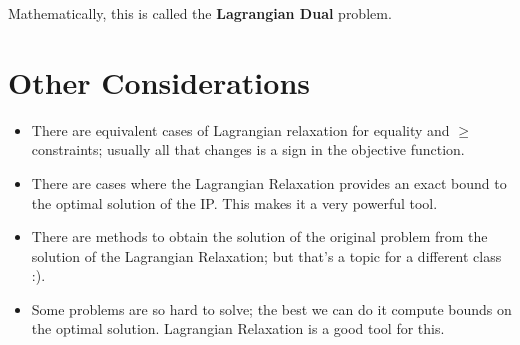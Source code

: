 \documentclass[11pt]{article}
\theoremstyle{definition}
\begin{document}
\vspace{2cm}

Mathematically, this is called the \textbf{Lagrangian Dual} problem.

\vfill

\section{Other Considerations}

\begin{itemize}
\item There are equivalent cases of Lagrangian relaxation for equality and $\geq$ constraints; usually all that changes is a sign in the objective function.
\item There are cases where the Lagrangian Relaxation provides an exact bound to the optimal solution of the IP. This makes it a very powerful tool.
\item There are methods to obtain the solution of the original problem from the solution of the Lagrangian Relaxation; but that's a topic for a different class :).
\item Some problems are so hard to solve; the best we can do it compute bounds on the optimal solution. Lagrangian Relaxation is a good tool for this.
\end{itemize}

\end{document}
